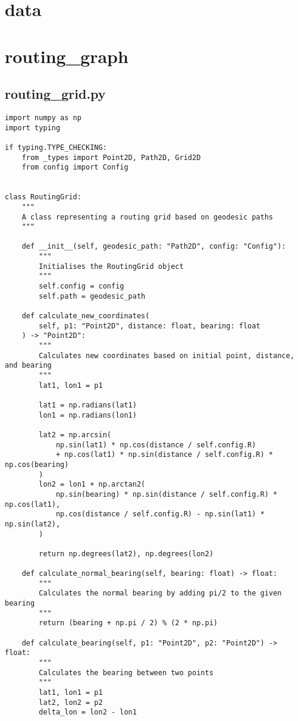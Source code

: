 \section{data}
\section{routing_graph}
\subsection{routing_grid.py}
\begin{verbatim}
import numpy as np
import typing

if typing.TYPE_CHECKING:
    from _types import Point2D, Path2D, Grid2D
    from config import Config


class RoutingGrid:
    """
    A class representing a routing grid based on geodesic paths
    """

    def __init__(self, geodesic_path: "Path2D", config: "Config"):
        """
        Initialises the RoutingGrid object
        """
        self.config = config
        self.path = geodesic_path

    def calculate_new_coordinates(
        self, p1: "Point2D", distance: float, bearing: float
    ) -> "Point2D":
        """
        Calculates new coordinates based on initial point, distance, and bearing
        """
        lat1, lon1 = p1

        lat1 = np.radians(lat1)
        lon1 = np.radians(lon1)

        lat2 = np.arcsin(
            np.sin(lat1) * np.cos(distance / self.config.R)
            + np.cos(lat1) * np.sin(distance / self.config.R) * np.cos(bearing)
        )
        lon2 = lon1 + np.arctan2(
            np.sin(bearing) * np.sin(distance / self.config.R) * np.cos(lat1),
            np.cos(distance / self.config.R) - np.sin(lat1) * np.sin(lat2),
        )

        return np.degrees(lat2), np.degrees(lon2)

    def calculate_normal_bearing(self, bearing: float) -> float:
        """
        Calculates the normal bearing by adding pi/2 to the given bearing
        """
        return (bearing + np.pi / 2) % (2 * np.pi)

    def calculate_bearing(self, p1: "Point2D", p2: "Point2D") -> float:
        """
        Calculates the bearing between two points
        """
        lat1, lon1 = p1
        lat2, lon2 = p2
        delta_lon = lon2 - lon1


\end{verbatim}
